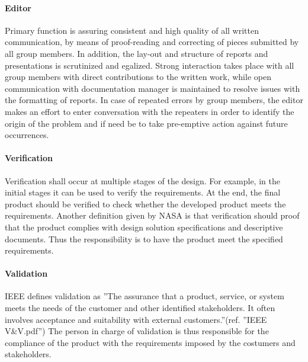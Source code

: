 \paragraph{Editor}
Primary function is assuring consistent and high quality of all written communication, by means of proof-reading and correcting of pieces submitted by all group members. In addition, the lay-out and structure of reports and presentations is scrutinized and egalized. Strong interaction takes place with all group members with direct contributions to the written work, while open communication with documentation manager is maintained to resolve issues with the formatting of reports. In case of repeated errors by group members, the editor makes an effort to enter conversation with the repeaters in order to identify the origin of the problem and if need be to take pre-emptive action against future occurrences.
\paragraph{Verification}
Verification shall occur at multiple stages of the design. For example, in the initial stages it can be used to verify the requirements. At the end, the final product should be verified to check whether the developed product meets the requirements. Another definition given by NASA is that verification should proof that the product complies with design solution specifications and descriptive documents. Thus the responsibility is to have the product meet the specified requirements.

\paragraph{Validation}
IEEE defines validation as ''The assurance that a product, service, or system meets the needs of the customer and other identified stakeholders. It often involves acceptance and suitability with external customers.''(ref. ''IEEE V\&V.pdf'') The person in charge of validation is thus responsible for the compliance of the product with the requirements imposed by the costumers and stakeholders. 
